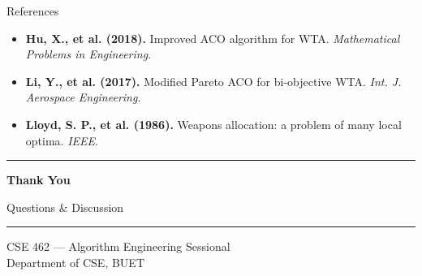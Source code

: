 \documentclass[aspectratio=169,10pt]{beamer}
\begin{document}
\begin{frame}[shrink=5]{References}
\begin{itemize}
    \item[\hypertarget{ref13}{[13]}] \textbf{Hu, X., et al. (2018).} Improved ACO algorithm for WTA. \textit{Mathematical Problems in Engineering}.
    \item[\hypertarget{ref14}{[14]}] \textbf{Li, Y., et al. (2017).} Modified Pareto ACO for bi-objective WTA. \textit{Int. J. Aerospace Engineering}.
    \item[\hypertarget{ref15}{[15]}] \textbf{Lloyd, S. P., et al. (1986).} Weapons allocation: a problem of many local optima. \textit{IEEE}.
  \end{itemize}
\end{frame}


{
\begin{frame}[plain]
  \begin{center}
    \vspace{1.2cm}

    {\color{goldaccent}\rule{0.25\textwidth}{2pt}}

    \vspace{0.5cm}
    {\color{white}\Huge\bfseries Thank You}

    \vspace{0.4cm}
    {\color{iceblue}\large Questions \& Discussion}

    \vspace{0.6cm}
    {\color{goldaccent}\rule{0.25\textwidth}{2pt}}

    \vspace{0.8cm}

    {\color{iceblue}\small
      CSE 462 --- Algorithm Engineering Sessional\\[2pt]
      Department of CSE, BUET
    }
  \end{center}
\end{frame}
}
\end{document}
